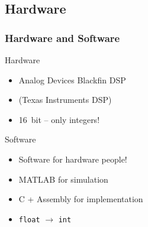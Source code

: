\subsection{Hardware}
\begin{frame}
    \frametitle{Hardware and Software}
    \begin{block}{Hardware}
        \begin{itemize}
        \item Analog Devices Blackfin DSP
        \item (Texas Instruments DSP)
        \item \SI{16}{bit} -- only integers!
        \end{itemize}
    \end{block}

    \pause
    \begin{block}{Software}
        \begin{itemize}
        \item Software for hardware people!
        \item MATLAB for simulation
        \item C + Assembly for implementation
        \item \texttt{float} $\rightarrow$ \texttt{int}
        \end{itemize}
    \end{block}
\end{frame}

